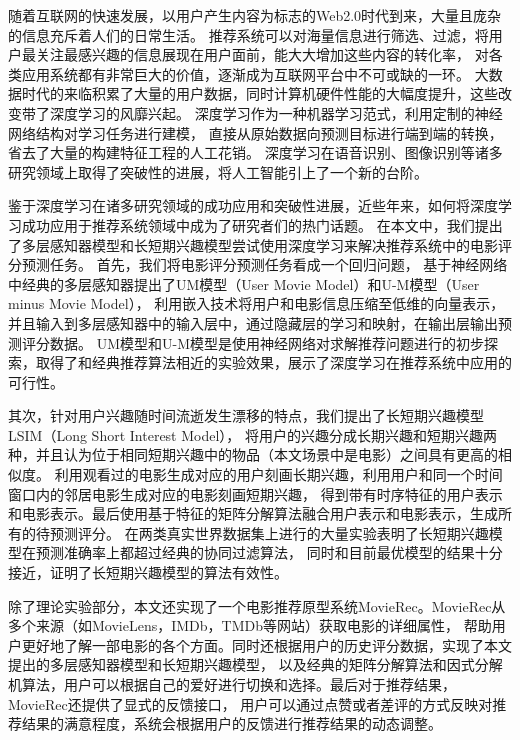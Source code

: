 \begin{cabstract}
随着互联网的快速发展，以用户产生内容为标志的Web2.0时代到来，大量且庞杂的信息充斥着人们的日常生活。
推荐系统可以对海量信息进行筛选、过滤，将用户最关注最感兴趣的信息展现在用户面前，能大大增加这些内容的转化率，
对各类应用系统都有非常巨大的价值，逐渐成为互联网平台中不可或缺的一环。
大数据时代的来临积累了大量的用户数据，同时计算机硬件性能的大幅度提升，这些改变带了深度学习的风靡兴起。
深度学习作为一种机器学习范式，利用定制的神经网络结构对学习任务进行建模，
直接从原始数据向预测目标进行端到端的转换，省去了大量的构建特征工程的人工花销。
深度学习在语音识别、图像识别等诸多研究领域上取得了突破性的进展，将人工智能引上了一个新的台阶。

鉴于深度学习在诸多研究领域的成功应用和突破性进展，近些年来，如何将深度学习成功应用于推荐系统领域中成为了研究者们的热门话题。
在本文中，我们提出了多层感知器模型和长短期兴趣模型尝试使用深度学习来解决推荐系统中的电影评分预测任务。
首先，我们将电影评分预测任务看成一个回归问题，
基于神经网络中经典的多层感知器提出了UM模型（User Movie Model）和U-M模型（User minus Movie Model），
利用嵌入技术将用户和电影信息压缩至低维的向量表示，并且输入到多层感知器中的输入层中，通过隐藏层的学习和映射，在输出层输出预测评分数据。
UM模型和U-M模型是使用神经网络对求解推荐问题进行的初步探索，取得了和经典推荐算法相近的实验效果，展示了深度学习在推荐系统中应用的可行性。

其次，针对用户兴趣随时间流逝发生漂移的特点，我们提出了长短期兴趣模型LSIM（Long Short Interest Model），
将用户的兴趣分成长期兴趣和短期兴趣两种，并且认为位于相同短期兴趣中的物品（本文场景中是电影）之间具有更高的相似度。
利用观看过的电影生成对应的用户刻画长期兴趣，利用用户和同一个时间窗口内的邻居电影生成对应的电影刻画短期兴趣，
得到带有时序特征的用户表示和电影表示。最后使用基于特征的矩阵分解算法融合用户表示和电影表示，生成所有的待预测评分。
在两类真实世界数据集上进行的大量实验表明了长短期兴趣模型在预测准确率上都超过经典的协同过滤算法，
同时和目前最优模型的结果十分接近，证明了长短期兴趣模型的算法有效性。

除了理论实验部分，本文还实现了一个电影推荐原型系统MovieRec。MovieRec从多个来源（如MovieLens，IMDb，TMDb等网站）获取电影的详细属性，
帮助用户更好地了解一部电影的各个方面。同时还根据用户的历史评分数据，实现了本文提出的多层感知器模型和长短期兴趣模型，
以及经典的矩阵分解算法和因式分解机算法，用户可以根据自己的爱好进行切换和选择。最后对于推荐结果，MovieRec还提供了显式的反馈接口，
用户可以通过点赞或者差评的方式反映对推荐结果的满意程度，系统会根据用户的反馈进行推荐结果的动态调整。
\end{cabstract}

